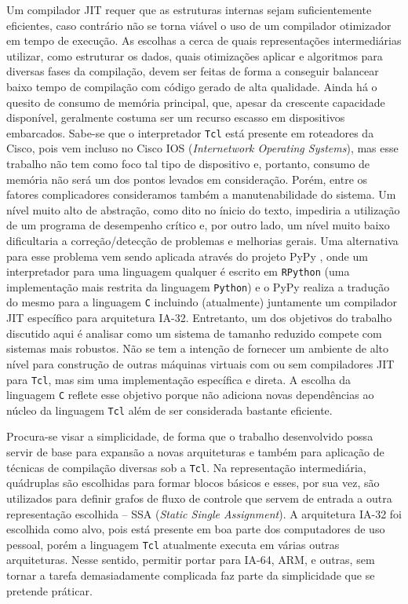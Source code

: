 Um compilador JIT requer que as estruturas internas sejam
suficientemente eficientes, caso contrário não se torna viável o
uso de um compilador otimizador em tempo de execução. As escolhas a
cerca de quais representações intermediárias utilizar, como estruturar
os dados, quais otimizações aplicar e algoritmos para diversas fases da
compilação, devem ser feitas de forma a conseguir balancear baixo
tempo de compilação com código gerado de alta qualidade. Ainda há o
quesito de consumo de memória principal, que, apesar da crescente
capacidade disponível, geralmente costuma ser um recurso escasso em
dispositivos embarcados. Sabe-se que o interpretador \texttt{Tcl} está
presente em roteadores da Cisco, pois vem incluso no Cisco IOS
(\textit{Internetwork Operating Systems}), mas esse trabalho
não tem como foco tal tipo de dispositivo e, portanto, consumo de
memória não será um dos pontos levados em consideração. Porém, entre
os fatores complicadores consideramos também a manutenabilidade do
sistema. Um nível muito alto de abstração, como dito no ínicio do
texto, impediria a utilização de um programa de desempenho crítico e,
por outro lado, um nível muito baixo dificultaria a correção/detecção de
problemas e melhorias gerais.
Uma alternativa para esse problema vem sendo aplicada através do
projeto PyPy \cite{pypy}, onde um interpretador para uma linguagem
qualquer é escrito em \texttt{RPython} (uma implementação mais
restrita da linguagem \texttt{Python}) e o PyPy realiza a tradução do
mesmo para a
linguagem \texttt{C} incluindo (atualmente) juntamente um compilador
JIT específico para arquitetura IA-32. Entretanto, um
dos objetivos do trabalho discutido aqui é analisar como um sistema de
tamanho reduzido compete com sistemas mais robustos. Não se tem a
intenção de fornecer um ambiente de alto nível para construção de
outras máquinas virtuais com ou sem compiladores JIT para
\texttt{Tcl}, mas sim uma implementação específica e direta.
A escolha da
linguagem \texttt{C} reflete esse objetivo porque não adiciona novas
dependências ao núcleo da linguagem \texttt{Tcl} além de ser
considerada bastante eficiente.

Procura-se visar a simplicidade, de forma que o trabalho desenvolvido
possa servir de base para expansão a novas arquiteturas e também para
aplicação de técnicas de compilação diversas sob a
\texttt{Tcl}. Na representação intermediária, quádruplas são
escolhidas para formar blocos básicos e
esses, por sua vez, são utilizados para definir grafos de fluxo de
controle que servem de entrada a outra representação escolhida -- SSA
(\textit{Static Single Assignment}). A arquitetura IA-32 foi escolhida
como alvo, pois está presente em boa parte dos computadores de uso
pessoal, porém a linguagem \texttt{Tcl} atualmente executa em várias
outras arquiteturas. Nesse sentido, permitir portar para IA-64, ARM, e
outras, sem tornar a tarefa demasiadamente complicada faz parte da
simplicidade que se pretende práticar.


